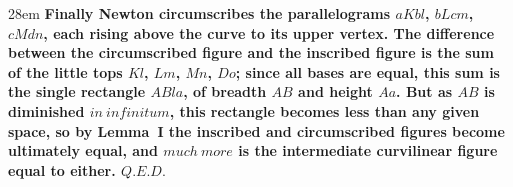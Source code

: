 \documentclass[border=4pt]{standalone}
\begin{document}
\begin{varwidth}{28em}
\large\bfseries
Finally Newton circumscribes the parallelograms $aKbl$, $bLcm$, $cMdn$,
each rising above the curve to its upper vertex.
The difference between the circumscribed figure and the inscribed figure
is the sum of the little tops $Kl$, $Lm$, $Mn$, $Do$; since all bases are equal,
this sum is the single rectangle $ABla$, of breadth $AB$ and height $Aa$.
But as $AB$ is diminished $in\ infinitum$, this rectangle becomes less
than any given space, so by Lemma~I the inscribed and circumscribed figures
become ultimately equal, and $much\ more$ is the intermediate curvilinear figure
equal to either.
$Q.E.D.$
\end{varwidth}
\end{document}
